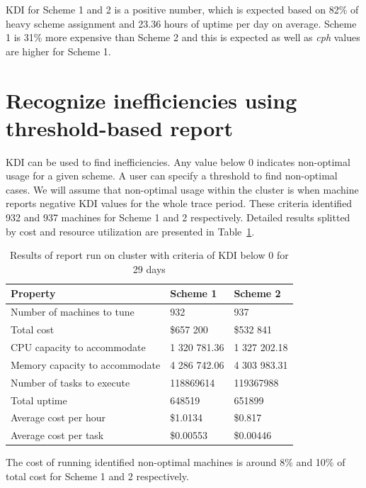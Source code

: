 \documentclass[]{final_report}
\begin{document}
KDI for Scheme 1 and 2 is a positive number, which is expected based on 82\% of heavy scheme assignment and 23.36 hours of uptime per day on average.
Scheme 1 is 31\% more expensive than Scheme 2 and this is expected as well as \textit{cph} values are higher for Scheme 1. 

\section{Recognize inefficiencies using threshold-based report}

KDI can be used to find inefficiencies.  Any value below 0 indicates non-optimal usage for a given scheme. 
A user can specify a threshold to find non-optimal cases. We will assume that non-optimal usage within the cluster is when machine reports negative KDI values for the whole trace period.
 These criteria identified 932 and 937 machines for Scheme 1 and 2 respectively. Detailed results splitted by cost and resource utilization are presented in Table~\ref{tab:threshold_based_report}.

\begin{table}[h]
\begin{center}
    \begin{tabular}{| l | l | l |}
    \hline
    \textbf{Property} & \textbf{Scheme 1} & \textbf{Scheme 2} \\
    \hline
    Number of machines to tune & 932 & 937 \\
    \hline
    Total cost & \$657 200 & \$532 841 \\
    \hline
    CPU capacity to accommodate & 1 320 781.36 & 1 327 202.18 \\
    \hline
    Memory capacity to accommodate & 4 286 742.06 & 4 303 983.31 \\
    \hline
    Number of tasks to execute & 118869614 & 119367988 \\
    \hline
    Total uptime & 648519 & 651899 \\
    \hline
    Average cost per hour & \$1.0134 & \$0.817 \\
    \hline
    Average cost per task & \$0.00553  & \$0.00446 \\
    \hline
    \end{tabular}
\end{center}
\caption{Results of report run on cluster with criteria of KDI below 0 for 29 days}
\label{tab:threshold_based_report}
\end{table}

The cost of running identified non-optimal machines is around 8\% and 10\% of total cost for Scheme 1 and 2 respectively.  
\end{document}
